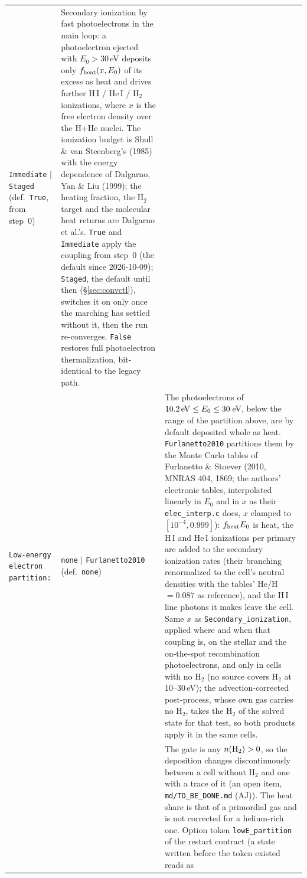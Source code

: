 \documentclass[english,a4paper]{my_memo}
\begin{document}
\begin{longtable}{@{}p{}p{}p{}@{}}
  \texttt{Immediate} $|$ \texttt{Staged} (def.\ \texttt{True}, from step~0) &
  Secondary ionization by
  fast photoelectrons in the main loop: a photoelectron ejected with
  $E_0>30\,$eV deposits only $f_{\rm heat}(x,E_0)$ of its excess as heat and
  drives further H\,I / He\,I / H$_2$ ionizations, where $x$ is the free
  electron density over the H$+$He nuclei. The ionization budget is Shull \&
  van Steenberg's (1985) with the energy dependence of Dalgarno, Yan \& Liu
  (1999); the heating fraction, the H$_2$ target and the molecular heat
  returns are Dalgarno et al.'s. \texttt{True} and \texttt{Immediate} apply
  the coupling from step~0 (the default since 2026-10-09);
  \texttt{Staged}, the default until then (\S\ref{sec:convctl}), switches it
  on only once the marching has settled without it, then the run
  re-converges. \texttt{False} restores full photoelectron thermalization,
  bit-identical to the legacy path. \\
\texttt{Low-energy electron partition:} & \texttt{none} $|$
  \texttt{Furlanetto2010} (def.\ \texttt{none}) & The photoelectrons of
  $10.2\,{\rm eV}\le E_0\le 30\,$eV, below the range of the partition above,
  are by default deposited whole as heat. \texttt{Furlanetto2010} partitions
  them by the Monte Carlo tables of Furlanetto \& Stoever (2010, MNRAS 404,
  1869; the authors' electronic tables, interpolated linearly in $E_0$ and in
  $x$ as their \texttt{elec\_interp.c} does, $x$ clamped to $[10^{-4},0.999]$):
  $f_{\rm heat}E_0$ is heat, the H\,I and He\,I ionizations per primary are
  added to the secondary ionization rates (their branching renormalized to
  the cell's neutral densities with the tables' He/H $=0.087$ as reference),
  and the H\,I line photons it makes leave the cell. Same $x$ as
  \texttt{Secondary\_ionization}, applied where and when that coupling is,
  on the stellar and the on-the-spot recombination photoelectrons, and only
  in cells with no H$_2$ (no source covers H$_2$ at 10--30\,eV); the
  advection-corrected post-process, whose own gas carries no H$_2$, takes the
  H$_2$ of the solved state for that test, so both products apply it in the
  same cells.
  \\
  & &  The gate is any $n({\rm H_2})>0$, so the deposition changes
  discontinuously between a cell without H$_2$ and one with a trace of it
  (an open item, \texttt{md/TO\_BE\_DONE.md} (AJ)). The heat share is that of a primordial gas and is not corrected
  for a helium-rich one. Option token \texttt{lowE\_partition} of the
  restart contract (a state written before the token existed reads as

\end{longtable}
\end{document}
